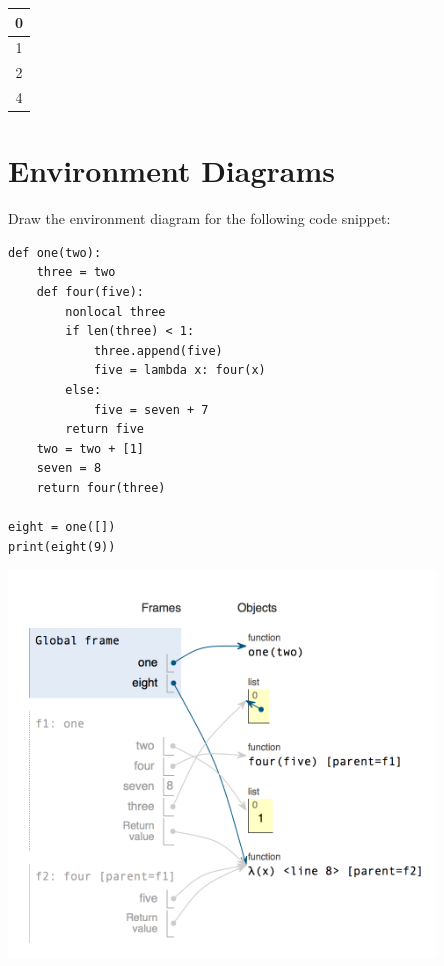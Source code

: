 \documentclass{exam}
\begin{document}
\begin{questions}
\begin{blocksection}
\begin{solution}
\begin{tabular}{|c|}
\hline
0\\\hline
1\\\hline
2\\\hline
4\\\hline
\end{tabular}
\end{solution}

\end{blocksection}

\section{Environment Diagrams}

\begin{blocksection}
\question Draw the environment diagram for the following code snippet:
\begin{lstlisting}
def one(two):
    three = two
    def four(five):
        nonlocal three
        if len(three) < 1:
            three.append(five)
            five = lambda x: four(x)
        else:
            five = seven + 7
        return five
    two = two + [1]
    seven = 8
    return four(three)

eight = one([])
print(eight(9))
\end{lstlisting}
\end{blocksection}

\begin{solution}
\includegraphics[width=0.85\textwidth]{envdiag}
\end{solution}


\end{questions}
\end{document}
